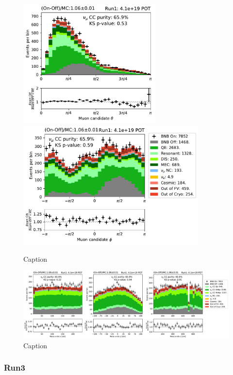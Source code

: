 \begin{figure}[H]
    \centering
    \includegraphics[height=6.5cm]{NuMuCCsel/Images/run1/numu_theta_run1.pdf} \hspace{2mm}
    \includegraphics[height=6.5cm]{NuMuCCsel/Images/run1/numu_phi_run1.pdf}
    \caption{Caption}
    \label{fig:numu_angles}
\end{figure}

\begin{figure}[H]
    \centering
    \includegraphics[width=\textwidth]{NuMuCCsel/Images/run1/numu_recovtx_run1.pdf}
    \caption{Caption}
    \label{fig:numu_vtx}
\end{figure}

\subsubsection{Run3}
\label{sssec:NuMUCCsel:INC:Run3}

